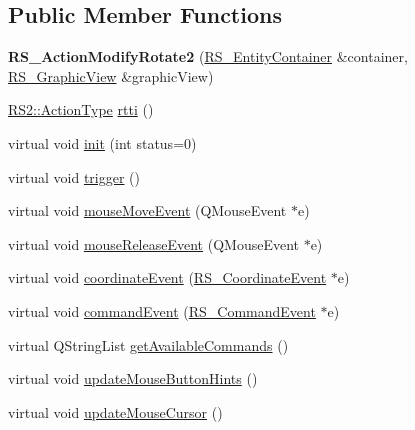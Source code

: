 \subsection*{Public Member Functions}
\begin{DoxyCompactItemize}
\item 
\hypertarget{classRS__ActionModifyRotate2_abb6041d59456b86185ac43af97dfcb98}{{\bfseries R\-S\-\_\-\-Action\-Modify\-Rotate2} (\hyperlink{classRS__EntityContainer}{R\-S\-\_\-\-Entity\-Container} \&container, \hyperlink{classRS__GraphicView}{R\-S\-\_\-\-Graphic\-View} \&graphic\-View)}\label{classRS__ActionModifyRotate2_abb6041d59456b86185ac43af97dfcb98}

\item 
\hyperlink{classRS2_afe3523e0bc41fd637b892321cfc4b9d7}{R\-S2\-::\-Action\-Type} \hyperlink{classRS__ActionModifyRotate2_a45af3ef28e1b82e096a08637e8e94c2f}{rtti} ()
\item 
virtual void \hyperlink{classRS__ActionModifyRotate2_a775bd7980ec6b08defb3b3dcd9ab9af5}{init} (int status=0)
\item 
virtual void \hyperlink{classRS__ActionModifyRotate2_af00ae4394d88de27453767b3f657a2fe}{trigger} ()
\item 
virtual void \hyperlink{classRS__ActionModifyRotate2_a40421660c3f92d157b283a0df16a00fe}{mouse\-Move\-Event} (Q\-Mouse\-Event $\ast$e)
\item 
virtual void \hyperlink{classRS__ActionModifyRotate2_a3c1ea7d63539286860acfd38683852ae}{mouse\-Release\-Event} (Q\-Mouse\-Event $\ast$e)
\item 
virtual void \hyperlink{classRS__ActionModifyRotate2_a2c9e32c2759ef343049cd9cde76e8426}{coordinate\-Event} (\hyperlink{classRS__CoordinateEvent}{R\-S\-\_\-\-Coordinate\-Event} $\ast$e)
\item 
virtual void \hyperlink{classRS__ActionModifyRotate2_aec226bf1b0d905a97a5299ef9583dd30}{command\-Event} (\hyperlink{classRS__CommandEvent}{R\-S\-\_\-\-Command\-Event} $\ast$e)
\item 
virtual Q\-String\-List \hyperlink{classRS__ActionModifyRotate2_a34363a8a9a56550a343619eba5ccc860}{get\-Available\-Commands} ()
\item 
virtual void \hyperlink{classRS__ActionModifyRotate2_a5c1a2dfd193ee571846968c63feab5ee}{update\-Mouse\-Button\-Hints} ()
\item 
virtual void \hyperlink{classRS__ActionModifyRotate2_a6d600a73c8ccac1bce8c8e9585bce12a}{update\-Mouse\-Cursor} ()
\end{DoxyCompactItemize}

